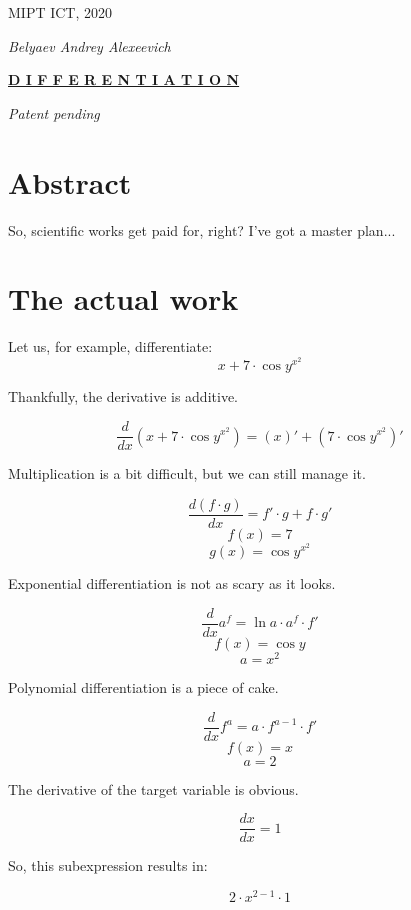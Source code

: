 \documentclass[12pt]{article}
\begin{document}
\begin{titlepage}\begin{center}\Large MIPT ICT, 2020\end{center}\begin{center}\Large\textit{Belyaev Andrey Alexeevich}\end{center}\begin{center}\Huge\textbf{\underline{D I F F E R E N T I A T I O N}}\end{center}\begin{center}\large\textit{Patent pending}\end{center}\section{\Large{Abstract}}
So, scientific works get paid for, right? I've got a master plan...\end{titlepage}

\section{\Large{The actual work}}

Let us, for example, differentiate:
$$  x  +  7  \cdot \cos  y ^{ x ^{ 2 }} $$


Thankfully, the derivative is additive.

$$ \frac{d}{dx} \left( x  +  7  \cdot \cos  y ^{ x ^{ 2 }}\right) = \left( x \right)' + \left( 7  \cdot \cos  y ^{ x ^{ 2 }}\right)' $$

Multiplication is a bit difficult, but we can still manage it.

$$ \frac{d (f \cdot g)}{dx} = f' \cdot g + f \cdot g' $$
$$ f(x) =  7  $$
 $$ g(x) = \cos  y ^{ x ^{ 2 }} $$

Exponential differentiation is not as scary as it looks.

$$ \frac{d}{dx} a^f = \ln{a} \cdot a^f \cdot f' $$
$$ f(x) = \cos  y  $$
 $$ a =  x ^{ 2 } $$

Polynomial differentiation is a piece of cake.

$$ \frac{d}{dx} f^{a} = a \cdot f^{a - 1} \cdot f' $$
$$ f(x) =  x  $$
 $$ a =  2  $$

The derivative of the target variable is obvious.

$$ \frac{dx}{dx} = 1 $$

So, this subexpression results in:

$$  2  \cdot  x ^{ 2  -  1 } \cdot  1  $$
\end{document}

